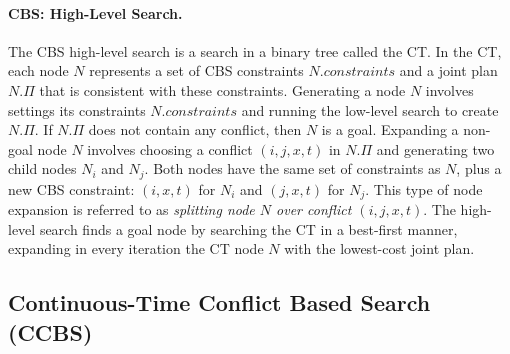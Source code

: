 \documentclass[letterpaper]{article} %
\newcommand{\cbs}{\ac{CBS}\xspace}
\newcommand{\ccbs}{\ac{CCBS}\xspace}
\newcommand{\ct}{\ac{CT}\xspace}
\newcommand{\mapfr}{{MAPF}$_R$\xspace}
\newcommand{\const}{\textit{constraints}\xspace}
\begin{document}
\paragraph{\cbs: High-Level Search.}
The \cbs high-level search is a search in a binary tree called the \ct. 
In the \ct, each node $N$ represents a set of \cbs constraints $N.\const$
and a joint plan $N.\Pi$ that is consistent with these constraints. 
Generating a node $N$ involves settings its constraints $N.\const$ and running the low-level search to create $N.\Pi$. 
If $N.\Pi$ does not contain any conflict, then $N$ is a goal. 
Expanding a non-goal node $N$ involves choosing a conflict $(i,j,x,t)$ in $N.\Pi$ 
and generating two child nodes $N_i$ and $N_j$. 
Both nodes have the same set of constraints as $N$, plus a new \cbs constraint: $(i,x,t)$ for $N_i$ and $(j,x,t)$ for $N_j$. 
This type of node expansion is referred to as \emph{splitting node $N$ over conflict $(i,j,x,t)$}.
The high-level search finds a goal node by searching the \ct in a best-first manner, expanding in every iteration the \ct node $N$ with the lowest-cost joint plan.



\subsection{Continuous-Time Conflict Based Search (CCBS)}


\end{document}
